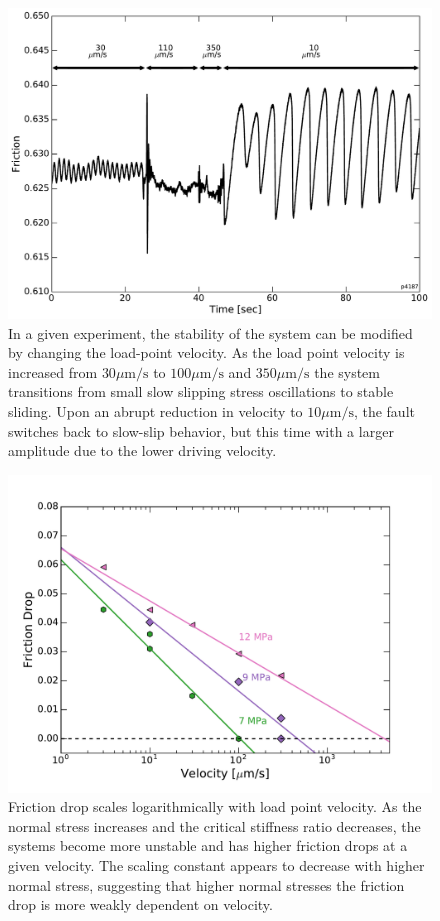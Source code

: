 \clearpage

\begin{figure}[H]
	\centering
		\includegraphics[scale=0.5]{chap_slow_slip_details/Figure_5.pdf}
   	\caption{In a given experiment, the stability of the system can be modified by changing the load-point velocity. As the load point velocity is increased from $30 \mu\text{m/s}$ to $100 \mu\text{m/s}$ and $350 \mu\text{m/s}$ the system transitions from small slow slipping stress oscillations to stable sliding. Upon an abrupt reduction in velocity to $10 \mu\text{m/s}$, the fault switches back to slow-slip behavior, but this time with a larger amplitude due to the lower driving velocity.}
  	\label{Figure_5}
\end{figure}

\clearpage

\begin{figure}[H]
	\centering
		\includegraphics[scale=0.55]{chap_slow_slip_details/Figure_6.pdf}
   	\caption{Friction drop scales logarithmically with load point velocity. As the normal stress increases and the critical stiffness ratio decreases, the systems become more unstable and has higher friction drops at a given velocity. The scaling constant appears to decrease with higher normal stress, suggesting that higher normal stresses the friction drop is more weakly dependent on velocity.}
  	\label{Figure_6}
\end{figure}

